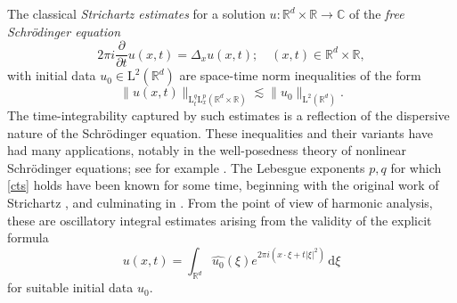 \documentclass[11pt,reqno]{amsart}
\numberwithin{equation}{section}
\newcommand{\dd}{\,\mathrm{d}}
\begin{document}
The classical \emph{Strichartz estimates} for a solution $u\colon\mathbb{R}^d\times\mathbb{R}\rightarrow\mathbb{C}$ of the \emph{free Schr\"{o}dinger equation}
\begin{equation*}%
2\pi i\frac{\partial}{\partial t} u(x,t) = \Delta_x u(x,t); \quad (x,t)\in\mathbb{R}^d\times \mathbb{R},
\end{equation*}
with initial data $u_0\in \mathrm{L}^2(\mathbb{R}^d)$ are space-time norm inequalities of the form
\begin{equation}\label{cts}
\|u(x,t)\|_{\mathrm{L}^q_t\mathrm{L}^p_x(\mathbb{R}^d\times\mathbb{R})}\lesssim\|u_0\|_{\mathrm{L}^2(\mathbb{R}^d)}.
\end{equation}
The time-integrability captured by such estimates is a reflection of the dispersive nature of the Schr\"{o}dinger equation. These inequalities and their variants have had many applications, notably in the well-posedness theory of nonlinear Schr\"{o}dinger equations; see for example \cite{TaoDisp}. 
The Lebesgue exponents $p,q$ for which \eqref{cts} holds have been known for some time, beginning with the original work of Strichartz \cite{Stric}, and culminating in \cite{KT}. From the point of view of harmonic analysis, these are oscillatory integral estimates arising from the validity of the explicit formula
\begin{equation}\label{eq:Eucl-solution} 
u(x,t)=\int_{\mathbb{R}^d}\widehat{u_0}(\xi) e^{2\pi i(x\cdot \xi+t|\xi|^2)}\dd \xi
\end{equation}
for suitable initial data $u_0$.
\end{document}
